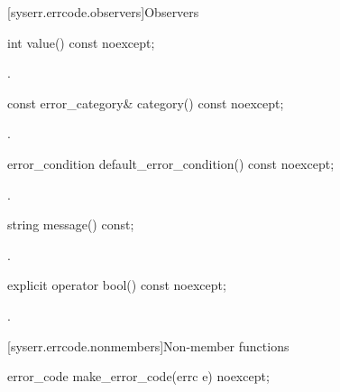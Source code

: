 [syserr.errcode.observers]{Observers}

%
\begin{itemdecl}
int value() const noexcept;
\end{itemdecl}

\begin{itemdescr}
\pnum
\returns
{}.
\end{itemdescr}

%
\begin{itemdecl}
const error_category& category() const noexcept;
\end{itemdecl}

\begin{itemdescr}
\pnum
\returns
{}.
\end{itemdescr}

%
\begin{itemdecl}
error_condition default_error_condition() const noexcept;
\end{itemdecl}

\begin{itemdescr}
\pnum
\returns
{}.
\end{itemdescr}

%
\begin{itemdecl}
string message() const;
\end{itemdecl}

\begin{itemdescr}
\pnum
\returns
{}.
\end{itemdescr}

%
\begin{itemdecl}
explicit operator bool() const noexcept;
\end{itemdecl}

\begin{itemdescr}
\pnum
\returns
{}.
\end{itemdescr}

[syserr.errcode.nonmembers]{Non-member functions}

%
\begin{itemdecl}
error_code make_error_code(errc e) noexcept;
\end{itemdecl}

